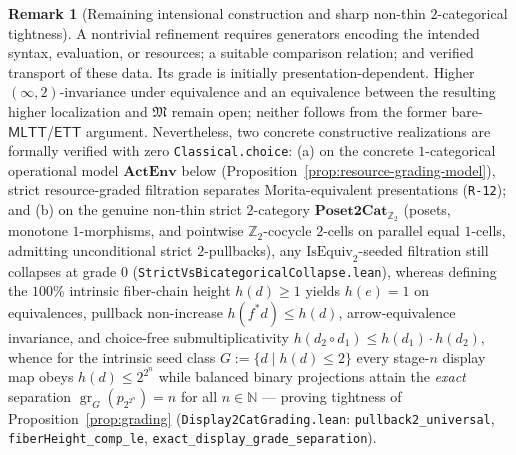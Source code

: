 \documentclass[11pt]{article}
\theoremstyle{plain}
\theoremstyle{definition}
\newtheorem{remark}[theorem]{Remark}
\newcommand{\fM}{\mathfrak{M}}
\newcommand{\gr}{\operatorname{gr}}
\newcommand{\MLTT}{\mathsf{MLTT}}
\newcommand{\ETT}{\mathsf{ETT}}
\begin{document}
\begin{remark}[Remaining intensional construction and sharp non-thin $2$-categorical tightness]\label{rem:grading-open}
A nontrivial refinement requires generators encoding the intended syntax, evaluation, or resources; a suitable comparison relation; and verified transport of these data. Its grade is initially presentation-dependent. Higher $(\infty,2)$-invariance under equivalence and an equivalence between the resulting higher localization and $\fM$ remain open; neither follows from the former bare-$\MLTT$/$\ETT$ argument. Nevertheless, two concrete constructive realizations are formally verified with zero \texttt{Classical.choice}: (a) on the concrete $1$-categorical operational model $\mathbf{ActEnv}$ below (Proposition~\ref{prop:resource-grading-model}), strict resource-graded filtration separates Morita-equivalent presentations (\texttt{R-12}); and (b) on the genuine non-thin strict $2$-category $\mathbf{Poset2Cat}_{\mathbb{Z}_2}$ (posets, monotone $1$-morphisms, and pointwise $\mathbb{Z}_2$-cocycle $2$-cells on parallel equal $1$-cells, admitting unconditional strict $2$-pullbacks), any $\mathrm{IsEquiv}_2$-seeded filtration still collapses at grade $0$ (\texttt{StrictVsBicategoricalCollapse.lean}), whereas defining the $100\%$ intrinsic fiber-chain height $h(d) \ge 1$ yields $h(e) = 1$ on equivalences, pullback non-increase $h(f^* d) \le h(d)$, arrow-equivalence invariance, and choice-free submultiplicativity $h(d_2 \circ d_1) \le h(d_1)\cdot h(d_2)$, whence for the intrinsic seed class $G := \{d \mid h(d) \le 2\}$ every stage-$n$ display map obeys $h(d) \le 2^{2^n}$ while balanced binary projections attain the \emph{exact} separation $\gr_G(p_{2^{2^n}}) = n$ for all $n \in \mathbb{N}$ --- proving tightness of Proposition~\ref{prop:grading} (\texttt{Display2CatGrading.lean}: \texttt{pullback2\_\allowbreak universal}, \texttt{fiberHeight\_\allowbreak comp\_\allowbreak le}, \texttt{exact\_\allowbreak display\_\allowbreak grade\_\allowbreak separation}).
\end{remark}
\end{document}
